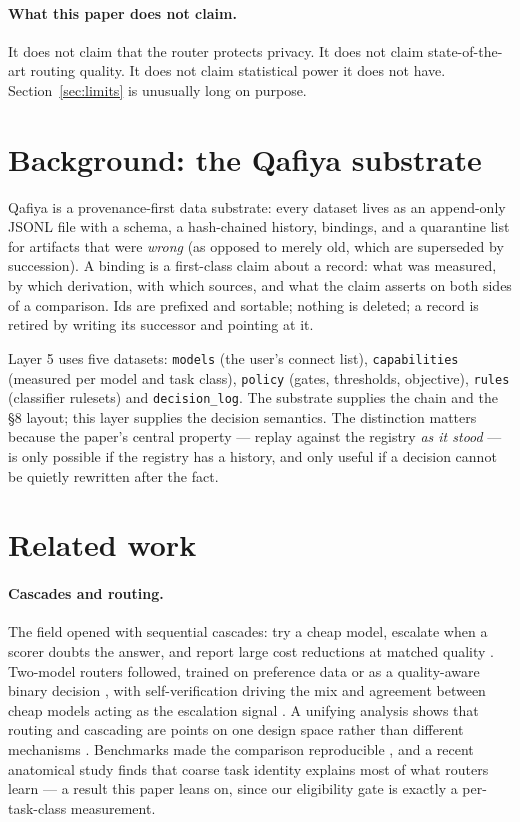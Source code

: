 \documentclass[11pt]{article}
\newcommand{\code}[1]{\texttt{#1}}
\begin{document}
\paragraph{What this paper does not claim.} It does not claim that the router protects privacy.
It does not claim state-of-the-art routing quality. It does not claim statistical power it does
not have. Section~\ref{sec:limits} is unusually long on purpose.

\section{Background: the Qafiya substrate}

Qafiya is a provenance-first data substrate: every dataset lives as an append-only JSONL file
with a schema, a hash-chained history, bindings, and a quarantine list for artifacts that were
\emph{wrong} (as opposed to merely old, which are superseded by succession). A binding is a
first-class claim about a record: what was measured, by which derivation, with which sources,
and what the claim asserts on both sides of a comparison. Ids are prefixed and sortable; nothing
is deleted; a record is retired by writing its successor and pointing at it.

Layer 5 uses five datasets: \code{models} (the user's connect list), \code{capabilities}
(measured per model and task class), \code{policy} (gates, thresholds, objective),
\code{rules} (classifier rulesets) and \code{decision\_log}. The substrate supplies the chain
and the §8 layout; this layer supplies the decision semantics. The distinction matters because
the paper's central property --- replay against the registry \emph{as it stood} --- is only
possible if the registry has a history, and only useful if a decision cannot be quietly rewritten
after the fact.


\section{Related work}\label{sec:related}

\paragraph{Cascades and routing.} The field opened with sequential cascades: try a cheap model,
escalate when a scorer doubts the answer, and report large cost reductions at matched quality
\cite{frugal,mot}. Two-model routers followed, trained on preference data \cite{routellm} or as a
quality-aware binary decision \cite{hybrid}, with self-verification driving the mix
\cite{automix} and agreement between cheap models acting as the escalation signal
\cite{agreement}. A unifying analysis shows that routing and cascading are points on one design
space rather than different mechanisms \cite{unified}. Benchmarks made the comparison
reproducible \cite{routerbench}, and a recent anatomical study finds that coarse task identity
explains most of what routers learn \cite{tasktype} --- a result this paper leans on, since our
eligibility gate is exactly a per-task-class measurement.
\end{document}
